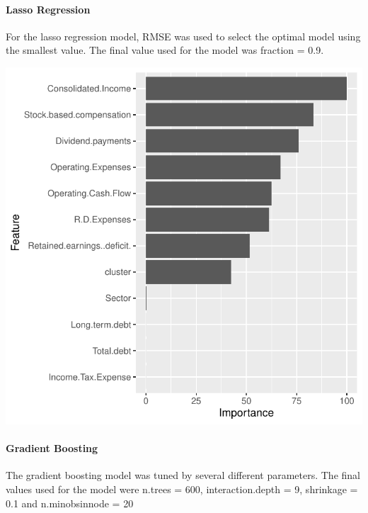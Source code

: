 \documentclass[11pt,]{article}
\begin{document}
\hypertarget{lasso-regression}{%
\paragraph{\texorpdfstring{\textbf{Lasso Regression}\\
}{Lasso Regression }}\label{lasso-regression}}

For the lasso regression model, RMSE was used to select the optimal
model using the smallest value. The final value used for the model was
fraction = 0.9.

\begin{center}\includegraphics{stock_analysis_files/figure-latex/Lasso regression-1} \end{center}

\hypertarget{gradient-boosting}{%
\paragraph{\texorpdfstring{\textbf{Gradient Boosting}\\
}{Gradient Boosting }}\label{gradient-boosting}}

The gradient boosting model was tuned by several different parameters.
The final values used for the model were n.trees = 600,
interaction.depth = 9, shrinkage = 0.1 and n.minobsinnode = 20
\end{document}
